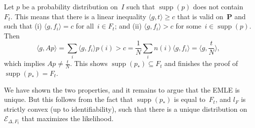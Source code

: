 \documentclass[aos,noinfoline]{imsart}
\DeclareMathOperator{\supp}{supp}
\newcommand{\Ecal}{\mathcal{E}}
\newcommand{\Pbf}{\mathbf{P}}
\newcommand{\gmle}{p_{*}}
\theoremstyle{remark}
\theoremstyle{definition}
\begin{document}
Let $p$ be a probability distribution on~$I$ such that $\supp(p)$ does not contain~$F_t$.  This means that there is a linear inequality $\langle g,t\rangle\ge c$
that is valid on~$\Pbf$ and such that
(i) $\langle g,f_{i}\rangle=c$ for all~$i\in F_{t}$; and
(ii) $\langle g,f_{i}\rangle>c$ for some~$i\in\supp(p)$.
Then
\begin{equation*}
  \langle g, A p\rangle = \sum_{i}\langle g,f_{i}\rangle p(i) > c
  = \frac{1}{N}\sum_{i}n(i) \langle g, f_{i}\rangle
  = \langle g, \frac{t}{N}\rangle,
\end{equation*}
which implies $Ap\neq \frac{t}{N}$.  This shows $\supp(\gmle)\subseteq F_t$ and finishes the proof of $\supp(\gmle)=F_{t}$.

We have shown the two properties, and it remains to argue that the EMLE is unique.  But this follows from the fact that
$\supp(\gmle)$ is equal to~$F_{t}$, and $l_{F}$ is strictly convex (up to identifiability), such that there is a unique
distribution on~$\Ecal_{\Delta,F_{t}}$ that maximizes the likelihood.

% 


\end{document}
